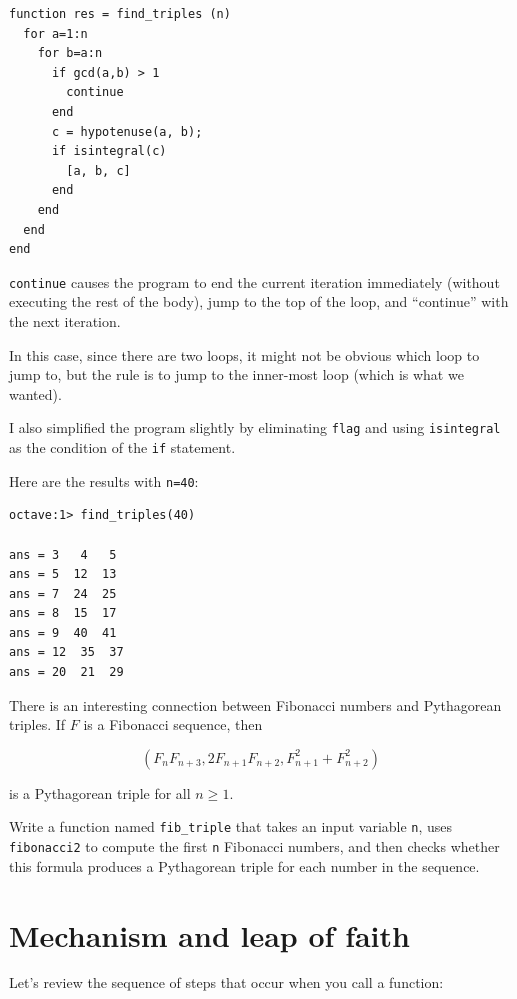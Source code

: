 \documentclass{book}
\begin{document}
\begin{verbatim}
function res = find_triples (n)
  for a=1:n
    for b=a:n
      if gcd(a,b) > 1
        continue
      end
      c = hypotenuse(a, b);
      if isintegral(c)
        [a, b, c]
      end
    end
  end
end
\end{verbatim}

{\tt continue} causes the program to end the current iteration
immediately (without executing the rest of the body), jump to
the top of the loop, and ``continue'' with the next iteration.

In this case, since there are two loops, it might not be obvious
which loop to jump to, but the rule is to jump to the inner-most
loop (which is what we wanted).

I also simplified the program slightly by eliminating
{\tt flag} and using {\tt isintegral} as the condition of the
{\tt if} statement.

Here are the results with {\tt n=40}:

\begin{verbatim}
octave:1> find_triples(40)

ans = 3   4   5
ans = 5  12  13
ans = 7  24  25
ans = 8  15  17
ans = 9  40  41
ans = 12  35  37
ans = 20  21  29
\end{verbatim}

There is an interesting connection between Fibonacci numbers and
Pythagorean triples. If $F$ is a Fibonacci sequence, then

\[ (F_n F_{n+3}, 2 F_{n+1} F_{n+2}, F_{n+1}^2 + F_{n+2}^2 ) \]

is a Pythagorean triple for all $n \ge 1$.

\begin{ex}
Write a function named {\tt fib\_triple} that
takes an input variable {\tt n}, uses {\tt fibonacci2} to compute
the first {\tt n} Fibonacci numbers, and then checks whether 
this formula produces a Pythagorean triple for each number
in the sequence.
\end{ex}



\section{Mechanism and leap of faith}

Let's review the sequence of steps that occur when you call
a function:
\end{document}
